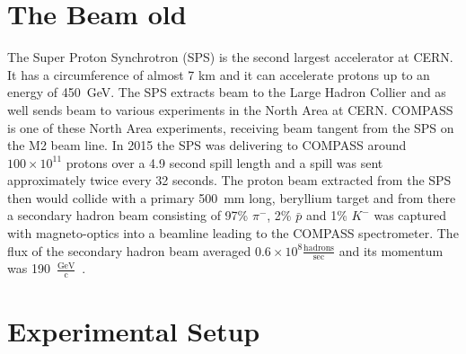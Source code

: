 \section{The Beam old}
The Super Proton Synchrotron (SPS) is the second largest accelerator
at CERN.  It has a circumference of almost 7 km and it can accelerate
protons up to an energy of 450~GeV.  The SPS extracts beam to the
Large Hadron Collier and as well sends beam to various experiments in
the North Area at CERN.  COMPASS is one of these North Area
experiments, receiving beam tangent from the SPS on the M2 beam line.
In 2015 the SPS was delivering to COMPASS around $100 \times 10^{11}$
protons over a 4.9 second spill length and a spill was sent
approximately twice every 32 seconds.  The proton beam extracted from
the SPS then would collide with a primary 500~mm long, beryllium
target and from there a secondary hadron beam consisting of 97\% $\pi
^-$, 2\% $\bar{p}$ and 1\% $K^-$ was captured with magneto-optics into
a beamline leading to the COMPASS spectrometer.  The flux of the
secondary hadron beam averaged $0.6 \times 10^8
\frac{\mathrm{hadrons}}{\mathrm{sec}}$ and its momentum was
190~$\frac{\mathrm{GeV}}{\mathrm{c}}$~\cite{compassDYpaper}.



\section{Experimental Setup}









